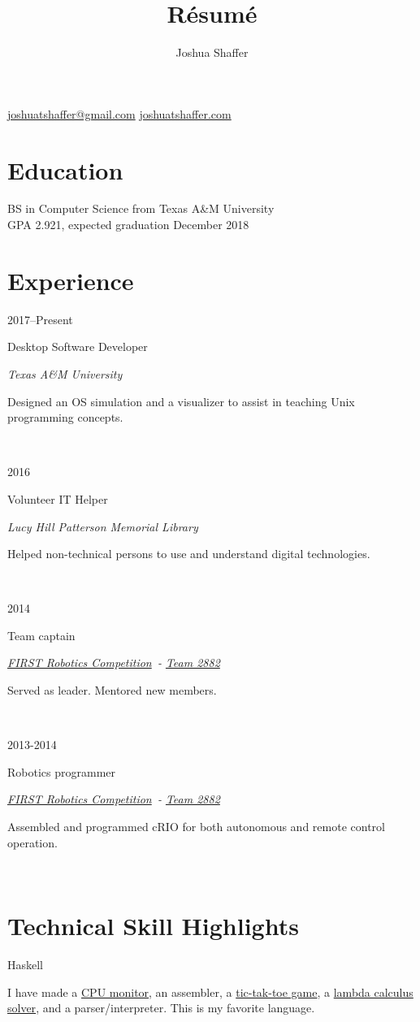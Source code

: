 \documentclass{article}
\title{R\'esum\'e}
\author{Joshua Shaffer}
\newcommand{\jskill}[2]{

\begin{minipage}[t]{.15\textwidth}
\hfill #1
\end{minipage}
\hspace{.05em}\vline\hspace{.05em}
\begin{minipage}[t]{.80\textwidth}
#2
\end{minipage}\\\vspace{.1em}}
\newcommand{\entry}[4]{
\jskill{#1}{#2

\textit{#3}

\footnotesize{#4}}
}
\newcommand{\frc}{\href{https://www.firstinspires.org/robotics/frc}{FIRST Robotics Competition}}
\newcommand{\frct}{\href{https://www.thebluealliance.com/team/2882}{Team 2882}}
\begin{document}
\begin{center}
 \begin{minipage}{2in}%
  \begin{center}
   \mbox{\huge\bfseries\theauthor}
   \mbox{\href{mailto:joshuatshaffer@gmail.com}{joshuatshaffer@gmail.com}}
   \mbox{\href{http://joshuatshaffer.com}{joshuatshaffer.com}}
  \end{center}
 \end{minipage}
 \hfill
\end{center}

\section{Education}

\noindent
BS in Computer Science from Texas A\&M University \\
GPA 2.921, expected graduation December 2018

\section{Experience}

\noindent
\entry
{2017--Present}
{Desktop Software Developer}
{Texas A\&M University}
{Designed an OS simulation and a visualizer to assist in teaching Unix programming concepts.}

\entry
{2016}
{Volunteer IT Helper}
{Lucy Hill Patterson Memorial Library}
{Helped non-technical persons to use and understand digital technologies.}

\entry
{2014}
{Team captain}
{\frc\ - \frct}
{Served as leader. Mentored new members.}

\entry
{2013-2014}
{Robotics programmer}
{\frc\ - \frct}
{Assembled and programmed cRIO for both autonomous and remote control operation.}

\section{Technical Skill Highlights}

\noindent
\jskill{Haskell}{I have made a \href{https://github.com/joshuatshaffer/retro-cpu-monitor/tree/master/host-haskell}{CPU monitor}, an assembler, a \href{https://github.com/joshuatshaffer/tic-tac-lambda}{tic-tak-toe game}, a \href{https://github.com/joshuatshaffer/de-bruijn-index}{lambda calculus solver}, and a parser/interpreter. This is my favorite language.}
\end{document}
